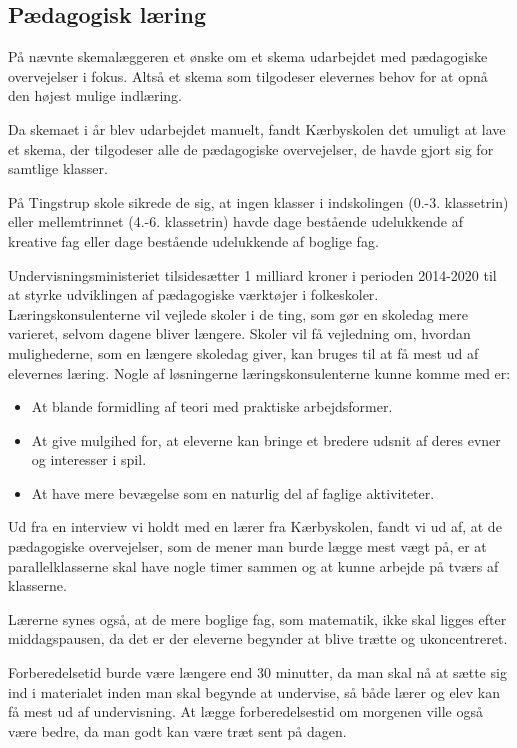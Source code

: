 \subsection{Pædagogisk læring}
\label{paedagogisk_laering}
På \school nævnte skemalæggeren et ønske om et skema udarbejdet med pædagogiske overvejelser i fokus. Altså et skema som tilgodeser elevernes behov for at opnå den højest mulige indlæring.

Da skemaet i år blev udarbejdet manuelt, fandt Kærbyskolen det umuligt at lave et skema, der tilgodeser alle de pædagogiske overvejelser, de havde gjort sig for samtlige klasser\cite{interview_Kaerby}.

På Tingstrup skole sikrede de sig, at ingen klasser i indskolingen (0.-3. klassetrin) eller mellemtrinnet (4.-6. klassetrin) havde dage bestående udelukkende af kreative fag eller dage bestående udelukkende af boglige fag. 

Undervisningsministeriet tilsidesætter 1 milliard kroner i perioden 2014-2020 til at styrke udviklingen af pædagogiske værktøjer i folkeskoler. Læringskonsulenterne vil vejlede skoler i de ting, som gør en skoledag mere varieret, selvom dagene bliver længere. Skoler vil få vejledning om, hvordan mulighederne, som en længere skoledag giver, kan bruges til at få mest ud af elevernes læring. Nogle af løsningerne læringskonsulenterne kunne komme med er:
\begin{itemize}
	\item At blande formidling af teori med praktiske arbejdsformer.
	\item At give mulgihed for, at eleverne kan bringe et bredere udsnit af deres evner og interesser i spil.
	\item At have mere bevægelse som en naturlig del af faglige aktiviteter\cite{Paedagogisklaering}.
\end{itemize}
Ud fra en interview vi holdt med en lærer fra Kærbyskolen, fandt vi ud af, at de pædagogiske overvejelser, som de mener man burde lægge mest vægt på, er at parallelklasserne skal have nogle timer sammen og at kunne arbejde på tværs af klasserne.

Lærerne synes også, at de mere boglige fag, som matematik, ikke skal ligges efter middagspausen, da det er der eleverne begynder at blive trætte og ukoncentreret. 

Forberedelsetid burde være længere end 30 minutter, da man skal nå at sætte sig ind i materialet inden man skal begynde at undervise, så både lærer og elev kan få mest ud af undervisning. At lægge forberedelsestid om morgenen ville også være bedre, da man godt kan være træt sent på dagen.